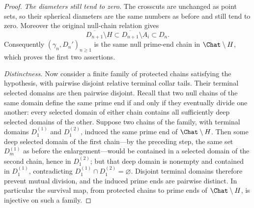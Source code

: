 \begin{proof}
\emph{The diameters still tend to zero.}
The crosscuts are unchanged as point sets, so their spherical diameters
are the same numbers as before and still tend to zero.  Moreover the
original null-chain relation gives
\[
 \overline{D_{n+1}}\setminus H
 \subset\overline{D_{n+1}}\setminus A_i
 \subset D_n.
\]
Consequently $(\gamma_n,D_n')_{n\ge1}$ is the same null prime-end chain in
$\Chat\setminus H$,
which proves the first two assertions.

\emph{Distinctness.}
Now consider a finite family of protected chains satisfying the
hypothesis, with pairwise disjoint relative terminal collar tails.  Their
terminal selected domains are then pairwise disjoint.  Recall
that two null chains of the same domain define the same prime end if and
only if they eventually divide one another: every selected domain of
either chain contains all sufficiently deep selected domains of the
other.  Suppose two chains of the family, with terminal domains
$D_1^{(1)}$ and $D_1^{(2)}$, induced the same prime end of
$\Chat\setminus H$.  Then some deep selected domain of the first
chain---by the preceding step, the same set $D_m^{(1)}$ as before the
enlargement---would be contained in a selected domain of the second
chain, hence in $D_1^{(2)}$; but that deep domain is nonempty and
contained in $D_1^{(1)}$, contradicting
$D_1^{(1)}\cap D_1^{(2)}=\varnothing$.  Disjoint terminal domains
therefore prevent mutual division, and the induced prime ends are
pairwise distinct.  In particular the survival map, from protected
chains to prime ends of $\Chat\setminus H$, is injective on such a
family.


\end{proof}
